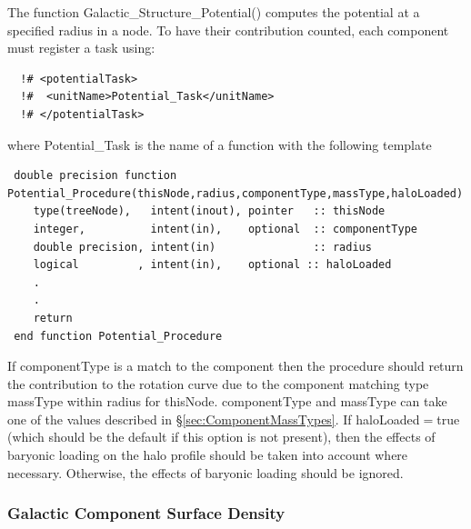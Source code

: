 The function {\normalfont \ttfamily Galactic\_Structure\_Potential()} computes the potential at a specified radius in a node. To have their contribution counted, each component must register a task using:
\begin{verbatim}
  !# <potentialTask>
  !#  <unitName>Potential_Task</unitName>
  !# </potentialTask>
\end{verbatim}
where {\normalfont \ttfamily Potential\_Task} is the name of a function with the following template
\begin{verbatim}
 double precision function Potential_Procedure(thisNode,radius,componentType,massType,haloLoaded)
    type(treeNode),   intent(inout), pointer   :: thisNode
    integer,          intent(in),    optional  :: componentType  
    double precision, intent(in)               :: radius
    logical         , intent(in),    optional :: haloLoaded
    .
    .
    return
 end function Potential_Procedure
\end{verbatim}
If {\normalfont \ttfamily componentType} is a match to the component then the procedure should return the contribution to the rotation curve due to the component matching type {\normalfont \ttfamily massType} within {\normalfont \ttfamily radius} for {\normalfont \ttfamily thisNode}. {\normalfont \ttfamily componentType} and {\normalfont \ttfamily massType} can take one of the values described in \S\ref{sec:ComponentMassTypes}. If {\normalfont \ttfamily haloLoaded}$=${\normalfont \ttfamily true} (which should be the default if this option is not present), then the effects of baryonic loading on the halo profile should be taken into account where necessary. Otherwise, the effects of baryonic loading should be ignored.

\subsubsection{Galactic Component Surface Density}

